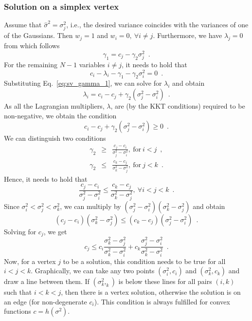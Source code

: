 \documentclass{article}
\numberwithin{equation}{section}
\newcommand{\ie}{{i.e.}}
\begin{document}
\subsubsection{Solution on a simplex vertex}

Assume that $\hat{\sigma}^2=\sigma_j^2$, \ie, the desired variance coincides with the variances of one of the Gaussians. Then $w_j=1$ and $w_i=0,~\forall i\neq j$. Furthermore, we have $\lambda_j=0$ from which follows
\begin{equation}
  \gamma_1 = c_j-\gamma_2 \sigma_j^2\enspace.\label{eq:sv_gamma_1}
\end{equation}
For the remaining $N-1$ variables $i\neq j$, it needs to hold that
\begin{equation}
  c_i-\lambda_i-\gamma_1-\gamma_2\sigma_i^2=0\enspace.
\end{equation}
Substituting Eq.~\eqref{eq:sv_gamma_1}, we can solve for $\lambda_i$ and obtain
\begin{equation}
  \lambda_i = c_i-c_j + \gamma_2(\sigma_j^2-\sigma_i^2)\enspace.
\end{equation}
As all the Lagrangian multipliers, $\lambda$, are (by the KKT conditions) required to be non-negative, we obtain the condition
\begin{equation}
  c_i-c_j+\gamma_2(\sigma_j^2-\sigma_i^2)\geq 0\enspace.
\end{equation}
We can distinguish two conditions
\begin{eqnarray}
  \gamma_2 &\geq& \frac{c_j-c_i}{\sigma_j^2-\sigma_i^2},~\text{for}~i<j\enspace,\\
  \gamma_2 &\leq& \frac{c_k-c_j}{\sigma_k^2-\sigma_j^2},~\text{for}~j<k\enspace.
\end{eqnarray}
Hence, it needs to hold that
\begin{equation}
   \frac{c_j-c_i}{\sigma_j^2-\sigma_i^2} \leq \frac{c_k-c_j}{\sigma_k^2-\sigma_j^2},~\forall i<j<k\enspace.
\end{equation}
Since $\sigma_i^2<\sigma_j^2<\sigma_k^2$, we can multiply by $(\sigma_j^2-\sigma_i^2)(\sigma_k^2-\sigma_j^2)$ and obtain
\begin{equation}
  (c_j-c_i)(\sigma_k^2-\sigma_j^2)\leq (c_k-c_j)(\sigma_j^2-\sigma_i^2)\enspace.
\end{equation}
Solving for $c_j$, we get
\begin{equation}
  c_j \leq c_i\frac{\sigma_k^2-\sigma_j^2}{\sigma_k^2-\sigma_i^2} +  c_k\frac{\sigma_j^2-\sigma_i^2}{\sigma_k^2-\sigma_i^2}\enspace.
\end{equation}
Now, for a vertex $j$ to be a solution, this condition needs to be true for all $i<j<k$. Graphically, we can take any two points $(\sigma_i^2,c_i)$ and $(\sigma_k^2,c_k)$ and draw a line between them. If $(\sigma_k^2,_k)$ is below these lines for all pairs $(i,k)$ such that $i<k<j$, then there is a vertex solution, otherwise the solution is on an edge (for non-degenerate $c_i$). This condition is always fulfilled for convex functions $c=h(\sigma^2)$.
\end{document}
